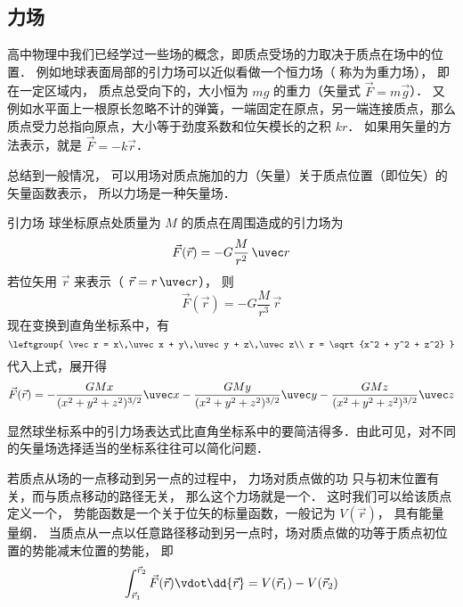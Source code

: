 

\subsection{力场}
高中物理中我们已经学过一些场的概念，即质点受场的力取决于质点在场中的位置． 例如地球表面局部的引力场可以近似看做一个恒力场（ 称为为重力场）， 即在一定区域内， 质点总受向下的，大小恒为 $mg$ 的重力（矢量式 $\vec F = m\vec g$）． 又例如水平面上一根原长忽略不计的弹簧，一端固定在原点，另一端连接质点，那么质点受力总指向原点，大小等于劲度系数和位矢模长的之积 $kr$． 如果用矢量的方法表示，就是 $\vec F = -k\vec r$．

总结到一般情况， 可以用场对质点施加的力（矢量）关于质点位置（即位矢）的矢量函数表示， 所以力场是一种矢量场．


\begin{exam}{引力场}\label{V_ex1}
球坐标原点处质量为 $M$ 的质点在周围造成的引力场为
\begin{equation}
\vec F(\vec r) =  - G\frac{M}{r^2}\,\uvec r
\end{equation} 
若位矢用 $\vec r$ 来表示（ $\vec r = r\,\uvec r$）， 则
\begin{equation}
\vec F(\vec r) =  - G\frac{M}{r^3}\,\vec r
\end{equation}
现在变换到直角坐标系中，有
\begin{equation}
\leftgroup{
\vec r = x\,\uvec x + y\,\uvec y + z\,\uvec z\\
r = \sqrt{x^2 + y^2 + z^2} 
}\end{equation} 
代入上式，展开得
\begin{equation}
\vec F(\vec r) =  - \frac{GMx}{(x^2+y^2+z^2)^{3/2}}\uvec x - \frac{GMy}{(x^2 +y^2+z^2)^{3/2}}\uvec y - \frac{GMz}{(x^2+y^2+z^2)^{3/2}}\uvec z 
\end{equation} 

显然球坐标系中的引力场表达式比直角坐标系中的要简洁得多．由此可见，对不同的矢量场选择适当的坐标系往往可以简化问题．
\end{exam}

若质点从场的一点移动到另一点的过程中， 力场对质点做的功 只与初末位置有关，而与质点移动的路径无关， 那么这个力场就是一个． 这时我们可以给该质点定义一个， 势能函数是一个关于位矢的标量函数，一般记为 $V(\vec r)$， 具有能量量纲． 当质点从一点以任意路径移动到另一点时，场对质点做的功等于质点初位置的势能减末位置的势能， 即
\begin{equation}\label{V_eq1}
\int_{\vec r_1}^{\vec r_2} \vec F(\vec r) \vdot \dd{\vec r} = V(\vec r_1)-V(\vec r_2)
\end{equation}

